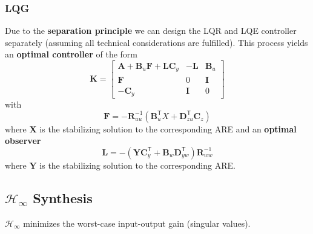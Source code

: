 \subsubsection{LQG}
Due to the \textbf{separation principle} we can design the LQR and LQE controller separately (assuming all technical considerations are fulfilled). This process yields an \textbf{optimal controller} of the form
\begin{equation*}
    \mathbf{K}=\left[\begin{array}{c|cc}%
            \mathbf{A}+\mathbf{B}_u \mathbf{F}+\mathbf{L}\mathbf{C}_y & -\mathbf{L} & \mathbf{B}_u \\
            \hline  %
            \mathbf{F}                                                & 0           & \mathbf{I}   \\
            -\mathbf{C}_y                                             & \mathbf{I}  & 0
        \end{array}\right]
\end{equation*}
with
\begin{equation*}
    \mathbf{F}=-\mathbf{R}_{uu}^{-1}(\mathbf{B}_{u}^{\mathsf{T}}X+\mathbf{D}_{zu}^{\mathsf{T}}\mathbf{C}_{z})
\end{equation*}
where $\mathbf{X}$ is the stabilizing solution to the corresponding ARE and an \textbf{optimal observer}
\begin{equation*}
    \mathbf{L}=-(\mathbf{Y}\mathbf{C}_y^{\mathsf{T}}+\mathbf{B}_w \mathbf{D}_{yw}^{\mathsf{T}})\mathbf{R}_{ww}^{-1}
\end{equation*}
where $\mathbf{Y}$ is the stabilizing solution to the corresponding ARE.


\subsection{\texorpdfstring{$\mathcal{H}_\infty$}{H-infinity} Synthesis}
$\mathcal{H}_\infty$ minimizes the worst-case input-output gain (singular values).

